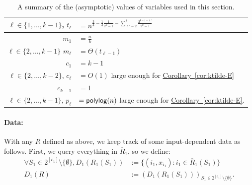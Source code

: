 \documentclass{article}
\newcommand{\cor}[1]{\hyperref[cor:#1]{Corollary~\ref*{cor:#1}}}
\renewcommand{\>}{\rangle}
\newcommand{\<}{\langle}
\renewcommand{\(}{\left(}
\renewcommand{\)}{\right)}
\begin{document}
\begin{table}
	\renewcommand{\arraystretch}{2}
	\centering
	\begin{tabular}{ |r|l|}
		\hline
		$\ell\in\{1,\dots,k-1\}$, $t_{\ell}$ & $=n^{\frac{3}{4}-\frac{1}{4}\frac{1}{2^k-1} - \sum_{\ell'=2}^{\ell}\frac{2^{k-1-\ell'}}{2^k-1}}$\\
		\hline
		$m_1$ & $=\frac{n}{k}$\\
		\hline
		$\ell\in\{2,\dots,k-1\}$ $m_{\ell}$ & $=\Theta(t_{\ell-1})$\\
		\hline
		$c_1$ & $=k-1$\\
		\hline
		$\ell\in\{2,\dots,k-2\}$, $c_{\ell}$ & $=O(1)$ large enough for \cor{ktilde-E}\\
		\hline
		$c_{k-1}$ & $=1$\\
		\hline
		$\ell\in\{2,\dots,k-1\}$, $p_{\ell}$ & $={\sf polylog}(n)$ large enough for \cor{ktilde-E}.\\
		\hline
	\end{tabular}
	\caption{A summary of the (asymptotic) values of variables used in this section.}\label{tab:k-dist-setsizes}
\end{table}


\paragraph{Data:} With any $R$ defined as above, we keep track of some input-dependent data as follows. First, we query everything in $\overline{R}_1$, so we define:
\begin{equation}
\begin{split}
\forall S_1\in 2^{[c_1]}\setminus\{\emptyset\}, D_1(R_1(S_1)) &:= \{(i_1,x_{i_1}): i_1\in \overline{R}_1(S_1)\}\\
D_1(R) &:= \left( D_1(R_1(S_1))\right)_{S_1\in 2^{[c_1]}\setminus\{\emptyset\}}.
\end{split}\label{eq:k-dist-D-1}
\end{equation}
\end{document}
